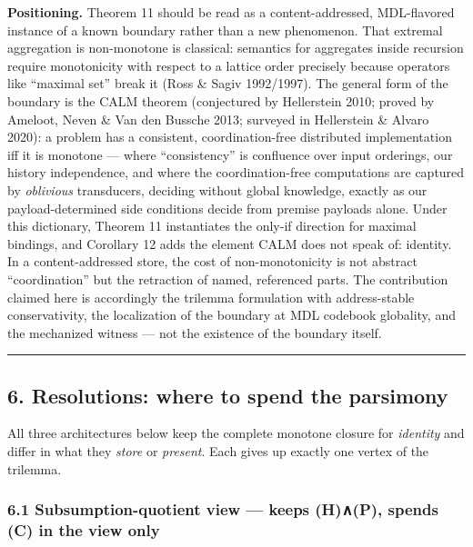 \documentclass[
  10pt,
]{article}
\begin{document}
\textbf{Positioning.} Theorem 11 should be read as a content-addressed,
MDL-flavored instance of a known boundary rather than a new phenomenon.
That extremal aggregation is non-monotone is classical: semantics for
aggregates inside recursion require monotonicity with respect to a
lattice order precisely because operators like ``maximal set'' break it
(Ross \& Sagiv 1992/1997). The general form of the boundary is the CALM
theorem (conjectured by Hellerstein 2010; proved by Ameloot, Neven \&
Van den Bussche 2013; surveyed in Hellerstein \& Alvaro 2020): a problem
has a consistent, coordination-free distributed implementation iff it is
monotone --- where ``consistency'' is confluence over input orderings,
our history independence, and where the coordination-free computations
are captured by \emph{oblivious} transducers, deciding without global
knowledge, exactly as our payload-determined side conditions decide from
premise payloads alone. Under this dictionary, Theorem 11 instantiates
the only-if direction for maximal bindings, and Corollary 12 adds the
element CALM does not speak of: identity. In a content-addressed store,
the cost of non-monotonicity is not abstract ``coordination'' but the
retraction of named, referenced parts. The contribution claimed here is
accordingly the trilemma formulation with address-stable conservativity,
the localization of the boundary at MDL codebook globality, and the
mechanized witness --- not the existence of the boundary itself.

\begin{center}\rule{0.5\linewidth}{0.5pt}\end{center}

\hypertarget{resolutions-where-to-spend-the-parsimony}{%
\subsection{6. Resolutions: where to spend the
parsimony}\label{resolutions-where-to-spend-the-parsimony}}

All three architectures below keep the complete monotone closure for
\emph{identity} and differ in what they \emph{store} or \emph{present}.
Each gives up exactly one vertex of the trilemma.

\hypertarget{subsumption-quotient-view-keeps-hp-spends-c-in-the-view-only}{%
\subsubsection{6.1 Subsumption-quotient view --- keeps (H)∧(P), spends
(C) in the view
only}\label{subsumption-quotient-view-keeps-hp-spends-c-in-the-view-only}}
\end{document}
